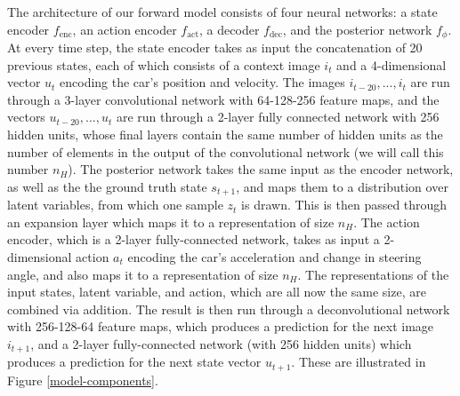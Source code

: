 \documentclass{article} %
\begin{document}
The architecture of our forward model consists of four neural networks: a state encoder $f_\text{enc}$, an action encoder $f_\text{act}$, a decoder $f_\text{dec}$, and the posterior network $f_\phi$.
At every time step, the state encoder takes as input the concatenation of 20 previous states, each of which consists of a context image $i_t$ and a 4-dimensional vector $u_t$ encoding the car's position and velocity.
The images $i_{t-20}, ..., i_t$ are run through a 3-layer convolutional network with 64-128-256 feature maps, and the vectors $u_{t-20}, ..., u_t$ are run through a 2-layer fully connected network with 256 hidden units, whose final layers contain the same number of hidden units as the number of elements in the output of the convolutional network (we will call this number $n_H$).
The posterior network takes the same input as the encoder network, as well as the the ground truth state $s_{t+1}$, and maps them to a distribution over latent variables, from which one sample $z_t$ is drawn.
This is then passed through an expansion layer which maps it to a representation of size $n_H$.
The action encoder, which is a 2-layer fully-connected network, takes as input a 2-dimensional action $a_t$ encoding the car's acceleration and change in steering angle, and also maps it to a representation of size $n_H$.
The representations of the input states, latent variable, and action, which are all now the same size, are combined via addition.
The result is then run through a deconvolutional network with 256-128-64 feature maps, which produces a prediction for the next image $i_{t+1}$, and a 2-layer fully-connected network (with 256 hidden units) which produces a prediction for the next state vector $u_{t+1}$. These are illustrated in Figure \ref{model-components}.
\end{document}
